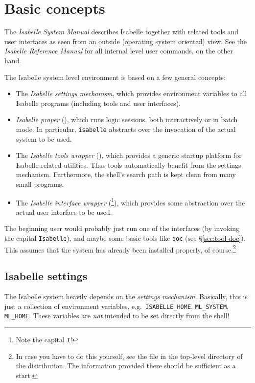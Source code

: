 

\chapter{Basic concepts}

The \emph{Isabelle System Manual} describes Isabelle together with
related tools and user interfaces as seen from an outside (operating
system oriented) view.  See the \emph{Isabelle Reference Manual} for
all internal {\ML} level user commands, on the other hand.

\medskip The Isabelle system level environment is based on a few
general concepts:
\begin{itemize}
\item The \emph{Isabelle settings mechanism}, which provides
  environment variables to all Isabelle programs (including tools and
  user interfaces).
\item \emph{Isabelle proper} (), which runs logic
  sessions, both interactively or in batch mode. In particular,
  \texttt{isabelle} abstracts over the invocation of the actual {\ML}
  system to be used.
\item The \emph{Isabelle tools wrapper} (), which
  provides a generic startup platform for Isabelle related utilities.
  Thus tools automatically benefit from the settings mechanism.
  Furthermore, the shell's search path is kept clean from many small
  programs.
\item The \emph{Isabelle interface wrapper}
  (\footnote{Note the capital \texttt{I}!}), which
  provides some abstraction over the actual user interface to be used.
\end{itemize}

\medskip The beginning user would probably just run one of the
interfaces (by invoking the capital \texttt{Isabelle}), and maybe some
basic tools like \texttt{doc} (see \S\ref{sec:tool-doc}).  This
assumes that the system has already been installed properly, of
course.\footnote{In case you have to do this yourself, see the
   file in the top-level directory of the
  distribution. The information provided there should be sufficient as
  a start.}


\section{Isabelle settings} \label{sec:settings}

The Isabelle system heavily depends on the \emph{settings
  mechanism}. Basically, this is just a collection
of environment variables, e.g.\ \texttt{ISABELLE_HOME},
\texttt{ML_SYSTEM}, \texttt{ML_HOME}.  These variables are \emph{not}
intended to be set directly from the shell!

